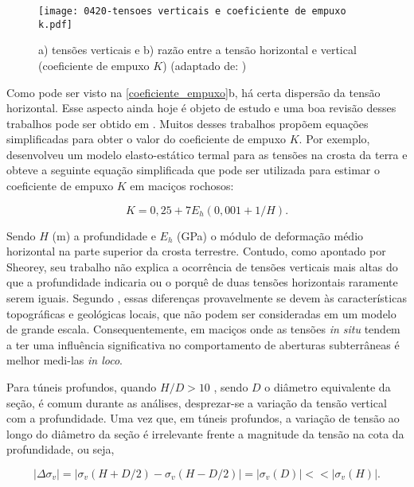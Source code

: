 \begin{figure}[H]
	\begin{center}
		\texttt{[image: 0420-tensoes verticais e coeficiente de empuxo k.pdf]}
	\end{center}
	\caption{\label{coeficiente_empuxo}a) tensões verticais e b) razão entre a tensão horizontal e vertical (coeficiente de empuxo $K$)  (adaptado de: )}
\end{figure}

Como pode ser visto na \autoref{coeficiente_empuxo}b, há certa dispersão da tensão horizontal. Esse aspecto ainda hoje é objeto de estudo e uma boa revisão desses trabalhos pode ser obtido em . Muitos desses trabalhos propõem equações simplificadas para obter o valor do coeficiente de empuxo $K$. Por exemplo,  desenvolveu um modelo elasto-estático termal para as tensões na crosta da terra e obteve a seguinte equação simplificada que pode ser utilizada para estimar o coeficiente de empuxo $K$ em maciços rochosos:

\begin{equation}
	K = 0,25 + 7E_h(0,001+1/H).
\end{equation}

Sendo $H$ (m) a profundidade e $E_h$ (GPa) o módulo de deformação médio horizontal na parte superior da crosta terrestre. Contudo, como apontado por Sheorey, seu trabalho não explica a ocorrência de tensões verticais mais altas do que a profundidade indicaria ou o porquê de duas tensões horizontais raramente serem iguais. Segundo , essas diferenças provavelmente se devem às características topográficas e geológicas locais, que não podem ser consideradas em um modelo de grande escala. Consequentemente, em maciços onde as tensões \textit{in situ} tendem a ter uma influência significativa no comportamento de aberturas subterrâneas é melhor medi-las \textit{in loco}.

Para túneis profundos, quando $H/D > 10$ , sendo $D$ o diâmetro equivalente da seção, é comum durante as análises, desprezar-se a variação da tensão vertical com a profundidade. Uma vez que, em túneis profundos, a variação de tensão ao longo do diâmetro da seção é irrelevante frente a magnitude da tensão na cota da profundidade, ou seja,

\begin{equation}
	\left|\Delta\sigma_v\right| = \left| \sigma_v(H+D/2)-\sigma_v(H-D/2)\right| = \left| \sigma_v(D) \right| <<  \left| \sigma_v(H)\right|.
\end{equation}

